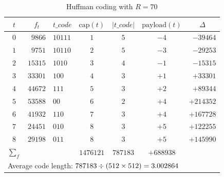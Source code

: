 \documentclass[journal]{IEEEtran}
\begin{document}
	\begin{table}[!t]
		\centering
		\caption{Huffman coding with \(R = 70\)}
		\label{tab:huffman}
		
		
		\begin{tabular}{c@{\;}rl@{}c@{\;}c@{\;}c@{}r}
			\toprule  
			\(t\) & 
			\multicolumn{1}{c}{\(f_t\)} & 
			\multicolumn{1}{c}{\(t\_code\)} & 
			\(\mathrm{cap}(t)\) & \(\vert t\_code \vert\) & \(\mathrm{payload}(t)\) & 
			\multicolumn{1}{c}{\(\Delta\)} \\
			\midrule  
			$0$ & $9866$  & $10111$ & $1$ & $5$ & $-4$ & $-39464$  \\ 
			$1$ & $9751$  & $10110$ & $2$ & $5$ & $-3$ & $-29253$  \\ 
			$2$ & $15315$ & $1010$  & $3$ & $4$ & $-1$ & $-15315$  \\ 
			$3$ & $33301$ & $100$   & $4$ & $3$ & $+1$ & $+33301$  \\ 
			$4$ & $44672$ & $111$   & $5$ & $3$ & $+2$ & $+89344$  \\ 
			$5$ & $53588$ & $00$    & $6$ & $2$ & $+4$ & $+214352$ \\ 
			$6$ & $41932$ & $110$   & $7$ & $3$ & $+4$ & $+167728$ \\ 
			$7$ & $24451$ & $010$   & $8$ & $3$ & $+5$ & $+122255$ \\ 
			$8$ & $29198$ & $011$   & $8$ & $3$ & $+5$ & $+145990$ \\ 
			\midrule 
			$\sum_f$ &  & & $1476121$ & $787183$ & $+688938$ & \\ 
			\midrule   
			\multicolumn{7}{l}{Average code length: \(787183 \divisionsymbol (512 \times 512) = 3.002864\)} \\
			\bottomrule
		\end{tabular}
		\label{tab:huffman:lena}
		
		

\end{table}
\end{document}
